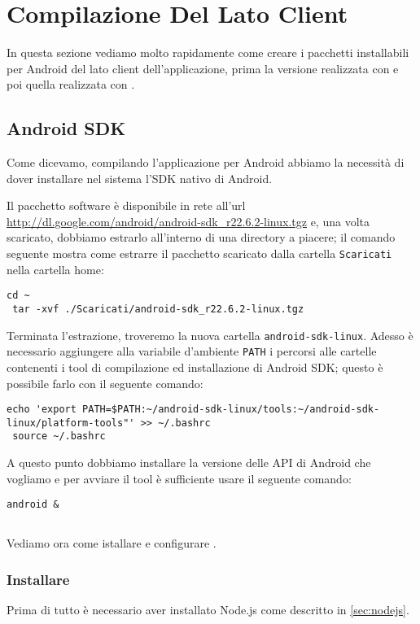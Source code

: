 \chapter{Compilazione Del Lato Client}

In questa sezione vediamo molto rapidamente come creare i pacchetti installabili
per Android del lato client dell'applicazione, prima la versione realizzata con
\pg{} e poi quella realizzata con \tisdk{}.

\section{Android SDK}
    Come dicevamo, compilando l'applicazione per Android abbiamo la necessità di
    dover installare nel sistema l'SDK nativo di Android.
    
    Il pacchetto software è disponibile in rete all'url
    \url{http://dl.google.com/android/android-sdk_r22.6.2-linux.tgz} e, una
    volta scaricato, dobbiamo estrarlo all'interno di una directory a piacere;
    il comando seguente mostra come estrarre il pacchetto scaricato dalla 
    cartella \texttt{Scaricati} nella cartella home:
    \begin{lstlisting}[language=plane]
 cd ~
 tar -xvf ./Scaricati/android-sdk_r22.6.2-linux.tgz
    \end{lstlisting}
    Terminata l'estrazione, troveremo la nuova cartella
    \texttt{android-sdk-linux}. Adesso è necessario aggiungere alla 
    variabile d'ambiente \texttt{PATH} i percorsi alle cartelle contenenti i 
    tool di compilazione ed installazione di Android SDK; questo è possibile 
    farlo con il seguente comando:
    \begin{lstlisting}[language=plane]
 echo 'export PATH=$PATH:~/android-sdk-linux/tools:~/android-sdk-linux/platform-tools"' >> ~/.bashrc
 source ~/.bashrc
    \end{lstlisting}
    A questo punto dobbiamo installare la versione delle API di Android che 
    vogliamo e per avviare il tool è sufficiente usare il seguente comando:
    \begin{lstlisting}[language=plane]
 android &
    \end{lstlisting}
     

\section{\pg{}}
    Vediamo ora come istallare e configurare \pg{}.
    
    \subsection{Installare \pg{}}
        Prima di tutto è necessario aver installato Node.js come descritto in 
        \ref{sec:nodejs}.
        
